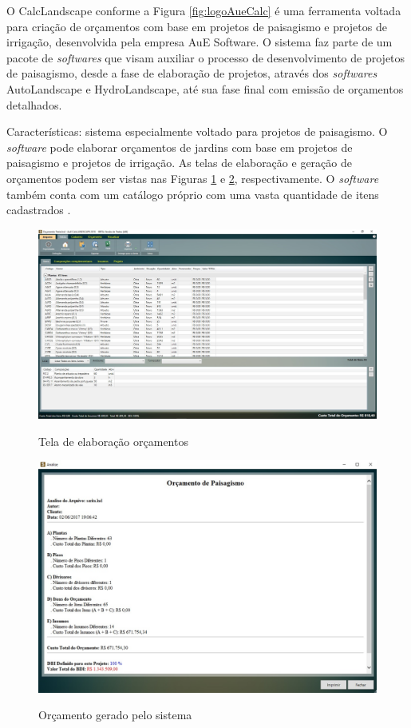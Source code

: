 O CalcLandscape conforme a Figura \ref{fig:logoAueCalc} é uma ferramenta voltada para criação de orçamentos com base em projetos de paisagismo e projetos de irrigação, desenvolvida pela empresa AuE Software. O sistema faz parte de um pacote de \textit{softwares} que visam auxiliar o processo de desenvolvimento de projetos de paisagismo, desde a fase de elaboração de projetos, através dos \textit{softwares} AutoLandscape e HydroLandscape, até sua fase final com emissão de orçamentos detalhados. 

Características: sistema especialmente voltado para projetos de paisagismo.
O \textit{software} pode elaborar orçamentos de jardins com base em projetos de paisagismo e projetos de irrigação.  As telas de elaboração e geração de orçamentos podem ser vistas nas Figuras \ref{fig:aueTelaElaboraçãoOrçamento} e \ref{fig:aueorcamentoAue}, respectivamente. O \textit{software} também conta com um catálogo próprio com uma vasta quantidade de itens cadastrados \cite{aue}.

\begin{figure}[htp]
\centering
\caption{Tela de elaboração orçamentos}
\includegraphics[width=13cm]{imagens/ElaOrcAUE.png}
\label{fig:aueTelaElaboraçãoOrçamento}
\end{figure}

 \begin{figure}[htp]
\centering
\caption{Orçamento gerado pelo sistema}
\includegraphics[width=13cm]{imagens/OrcAUE.png}
\label{fig:aueorcamentoAue}
\end{figure}


